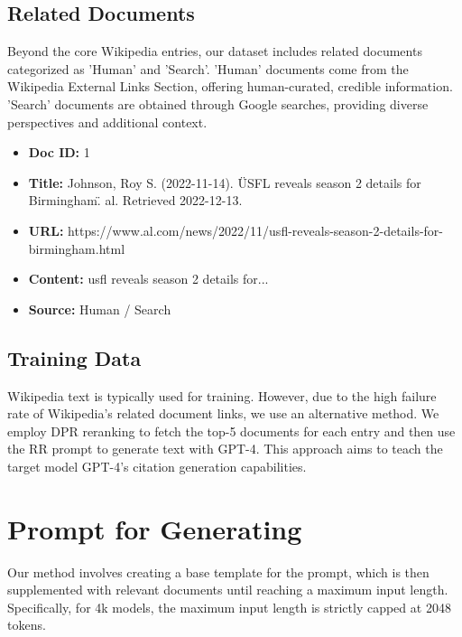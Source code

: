\subsection{Related Documents}
Beyond the core Wikipedia entries, our dataset includes related documents categorized as 'Human' and 'Search'. 'Human' documents come from the Wikipedia External Links Section, offering human-curated, credible information. 'Search' documents are obtained through Google searches, providing diverse perspectives and additional context.
\begin{tcolorbox}
\begin{itemize}
    \item \textbf{Doc ID:} 1
    \item \textbf{Title:} Johnson, Roy S. (2022-11-14). \"USFL reveals season 2 details for Birmingham\". al. Retrieved 2022-12-13.
    \item \textbf{URL:} https://www.al.com/news/2022/11/usfl-reveals-season-2-details-for-birmingham.html
    \item \textbf{Content:} usfl reveals season 2 details for...
    \item \textbf{Source:} Human / Search
\end{itemize}
\end{tcolorbox}

\subsection{Training Data} \label{appendix:training}
Wikipedia text is typically used for training. However, due to the high failure rate of Wikipedia's related document links, we use an alternative method. We employ DPR reranking to fetch the top-5 documents for each entry and then use the RR prompt to generate text with GPT-4. This approach aims to teach the target model GPT-4's citation generation capabilities.

\section{Prompt for Generating} \label{Prompt design}
Our method involves creating a base template for the prompt, which is then supplemented with relevant documents until reaching a maximum input length. Specifically, for 4k models, the maximum input length is strictly capped at 2048 tokens.

